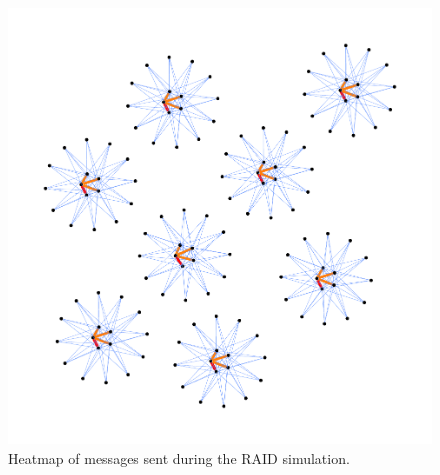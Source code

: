\documentclass[11pt]{book}
\begin{document}
\begin{figure}
\centering
\includegraphics[width=\textwidth,height=0.9\textheight,keepaspectratio]{figs/RAID}
\caption{Heatmap of messages sent during the RAID simulation.}
\end{figure}
\end{document}
